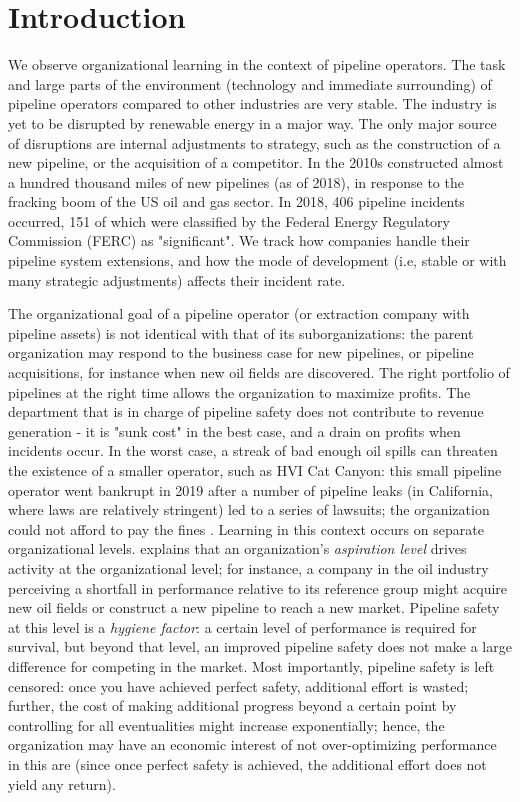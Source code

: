 \section{Introduction}
We observe organizational learning in the context of pipeline operators. The task and large parts of the environment (technology and immediate surrounding) of pipeline operators compared to other industries are very stable. The industry is yet to be disrupted by renewable energy in a major way. The only major source of disruptions are internal adjustments to strategy, such as the construction of a new pipeline, or the acquisition of a competitor. In the 2010s constructed almost a hundred thousand miles of new pipelines (as of 2018), in response to the fracking boom of the US oil and gas sector. In 2018, 406 pipeline incidents occurred, 151 of which were classified by the Federal Energy Regulatory Commission (FERC) as "significant". We track how companies handle their pipeline system extensions, and how the mode of development (i.e, stable or with many strategic adjustments) affects their incident rate.

The organizational goal of a pipeline operator (or extraction company with pipeline assets) is not identical with that of its suborganizations: the parent organization may respond to the business case for new pipelines, or pipeline acquisitions, for instance when new oil fields are discovered. The right portfolio of pipelines at the right time allows the organization to maximize profits. The department that is in charge of pipeline safety does not contribute to revenue generation - it is "sunk cost" in the best case, and a drain on profits when incidents occur. In the worst case, a streak of bad enough oil spills can threaten the existence of a smaller operator, such as HVI Cat Canyon: this small pipeline operator went bankrupt in 2019 after a number of pipeline leaks (in California, where laws are relatively stringent) led to a series of lawsuits; the organization could not afford to pay the fines \citep{WSJ2019}. Learning in this context occurs on separate organizational levels. \citet{Cyert1992} explains that an organization's \textit{aspiration level} drives activity at the organizational level; for instance, a company in the oil industry perceiving a shortfall in performance relative to its reference group might acquire new oil fields or construct a new pipeline to reach a new market. Pipeline safety at this level is a \textit{hygiene factor}: a certain level of performance is required for survival, but beyond that level, an improved pipeline safety does not make a large difference for competing in the market. Most importantly, pipeline safety is left censored: once you have achieved perfect safety, additional effort is wasted; further, the cost of making additional progress beyond a certain point by controlling for all eventualities might increase exponentially; hence, the organization may have an economic interest of not over-optimizing performance in this are (since once perfect safety is achieved, the additional effort does not yield any return).

